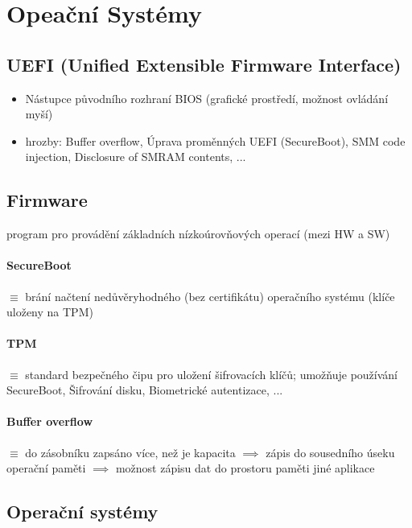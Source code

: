 \documentclass[10pt,a4paper]{article}
\begin{document}

\section{Opeační Systémy}

\subsection{UEFI (Unified Extensible Firmware Interface)}
\begin{itemize}
    \item Nástupce původního rozhraní BIOS (grafické prostředí, možnost ovládání myší)
    \item hrozby: Buffer overflow, Úprava proměnných UEFI (SecureBoot), SMM code injection, Disclosure of SMRAM contents, ...
\end{itemize}

\subsection{Firmware}

program pro provádění základních nízkoúrovňových operací (mezi HW a SW)

\paragraph*{SecureBoot} $\equiv$ brání načtení nedůvěryhodného (bez certifikátu) operačního systému (klíče uloženy na TPM)

\paragraph*{TPM} $\equiv$ standard bezpečného čipu pro uložení šifrovacích klíčů; umožňuje používání SecureBoot, Šifrování disku, Biometrické autentizace, ...

\paragraph*{Buffer overflow} $\equiv$ do zásobníku zapsáno více, než je kapacita $\implies$ zápis do sousedního úseku operační paměti $\implies$ možnost zápisu dat do prostoru paměti jiné aplikace

\subsection{Operační systémy}
\end{document}
